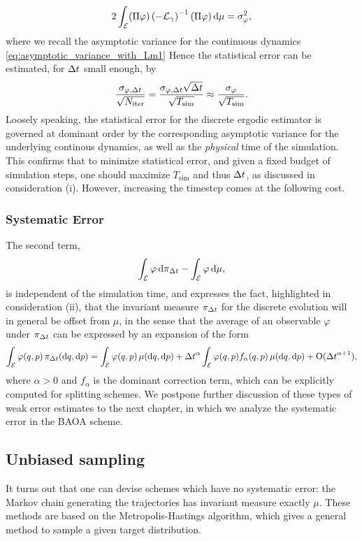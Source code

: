         \[2\int_{\mathcal E}(\Pi\varphi)\left(-\mathcal{L}_\gamma\right)^{-1}(\Pi\varphi)\,\mathrm{d}\mu = \sigma^2_\varphi,\]
        where we recall the asymptotic variance for the continuous dynamics \eqref{eq:asymptotic_variance_with_Lm1}
        Hence the statistical error can be estimated, for ${\Delta t}$ small enough, by 
        \[\frac{\sigma_{\varphi,{\Delta t}}}{\sqrt{N_{\mathrm{iter}}}}=\frac{\sigma_{\varphi,{\Delta t}}\sqrt{{\Delta t}}}{\sqrt{T_{\mathrm{sim}}}}\approx \frac{\sigma_\varphi}{\sqrt{T_{\mathrm{sim}}}}.\]
        Loosely speaking, the statistical error for the discrete ergodic estimator is governed at dominant order by the corresponding asymptotic variance for the underlying continous dynamics, as well as the \textit{physical} time of the simulation.
        This confirms that to minimize statistical error, and given a fixed budget of simulation steps, one should maximize $T_{\mathrm{sim}}$ and thus ${\Delta t}$, as discussed in consideration (i).
        However, increasing the timestep comes at the following cost.

        \subsubsection{Systematic Error}
        The second term,
        \[\int_\mathcal{E}\varphi\,\mathrm{d} \pi_{{\Delta t}}-\int_{\mathcal E}\varphi \,\mathrm{d} \mu,\]
        is independent of the simulation time, and expresses the fact, highlighted in consideration (ii), 
        that the invariant measure $\pi_{\Delta t}$ for the discrete evolution will in general be offset from $\mu$, in the sense that the average of an observable $\varphi$ under $\pi_{\Delta t}$ can be expressed by an expansion of the form
        \begin{equation}
            \label{eq:expansion_of_avg_in_dt}
            \int_{\mathcal E}\varphi(q,p)\,\pi_{\Delta t}(\mathrm{d} q,\mathrm{d} p)=\int_{\mathcal E}\varphi(q,p)\,\mu(\mathrm{d} q,\mathrm{d} p)+{\Delta t}^{\alpha}\int_{\mathcal E}\varphi(q,p)f_{\alpha}(q,p)\,\mu(\mathrm{d} q,\mathrm{d} p)+\mathrm{O}({\Delta t}^{\alpha+1}),
        \end{equation}
        where $\alpha>0$ and $f_{\alpha}$ is the dominant correction term, which can be explicitly computed for splitting schemes. 
        We postpone further discussion of these types of weak error estimates to the next chapter, in which we analyze the systematic error in the BAOA scheme.

    \subsection{Unbiased sampling}
     It turns out that one can devise schemes which have no systematic error: the Markov chain generating the trajectories has invariant measure exactly $\mu$.
     These methods are based on the Metropolis-Hastings algorithm, which gives a general method to sample a given target distribution.
